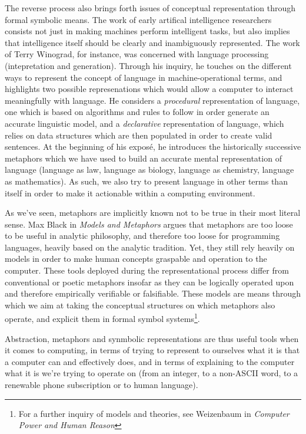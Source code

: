 \documentclass{article}
\begin{document}
The reverse process also brings forth issues of conceptual representation through formal symbolic means. The work of early artifical intelligence researchers consists not just in making machines perform intelligent tasks, but also implies that intelligence itself should be clearly and inambiguously represented. The work of Terry Winograd, for instance, was concerned with language processing (intepretation and generation)\cite{winograd_language_1982}. Through his inquiry, he touches on the different ways to represent the concept of language in machine-operational terms, and highlights two possible represenations which would allow a computer to interact meaningfully with language. He considers a \emph{procedural} representation of language, one which is based on algorithms and rules to follow in order generate an accurate linguistic model, and a \emph{declarative} representation of language, which relies on data structures which are then populated in order to create valid sentences. At the beginning of his exposé, he introduces the historically successive metaphors which we have used to build an accurate mental representation of language (language as law, language as biology, language as chemistry, language as mathematics). As such, we also try to present language in other terms than itself in order to make it actionable within a computing environment.

As we've seen, metaphors are implicitly known not to be true in their most literal sense. Max Black in \emph{Models and Metaphors} argues that metaphors are too loose to be useful in analytic philosophy, and therefore too loose for programming languages, heavily based on the analytic tradition. Yet, they still rely heavily on models in order to make human concepts graspable and operation to the computer. These tools deployed during the representational process differ from conventional or poetic metaphors insofar as they can be logically operated upon and therefore empirically verifiable or falsifiable. These models are means through which we aim at taking the conceptual structures on which metaphors also operate, and explicit them in formal symbol systems\footnote{For a further inquiry of models and theories, see Weizenbaum in \emph{Computer Power and Human Reason}}.

Abstraction, metaphors and synmbolic representations are thus useful tools when it comes to computing, in terms of trying to represent to ourselves what it is that a computer can and effectively does, and in terms of explaining to the computer what it is we're trying to operate on (from an integer, to a non-ASCII word, to a renewable phone subscription or to human language).
\end{document}
